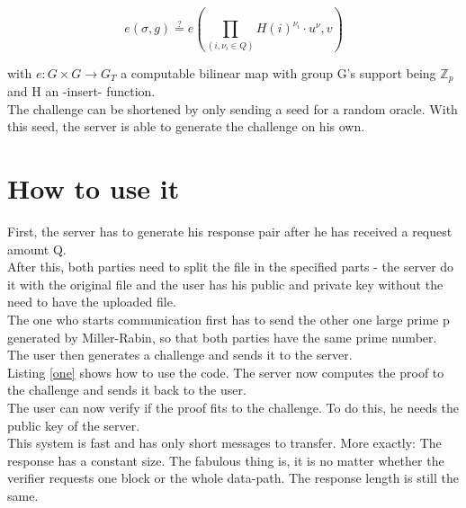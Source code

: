\documentclass{amsart}
\begin{document}
\begin{equation}
e(\sigma, g) \overset{?}{=} e(\prod_{(i,\nu_{i} \in Q)} H(i)^{\nu_{i}} \cdot u^{\nu}, v)
\end{equation}

with $e: G \times G \rightarrow G_{T}$ a computable bilinear map with group G's support being $\mathbb{Z}_{p}$ and H an -insert- function.\\

The challenge can be shortened by only sending a seed for a random oracle. With this seed, the server is able to generate the challenge on his own.



\section{How to use it}
First, the server has to generate his response pair after he has received a request amount Q.\\
After this, both parties need to split the file in the specified parts - the server do it with the original file and the user has his public and private key without the need to have the uploaded file.\\
The one who starts communication first has to send the other one large prime p generated by Miller-Rabin, so that both parties have the same prime number. The user then generates a challenge and sends it to the server.\\
Listing \ref{one} shows how to use the code. The server now computes the proof to the challenge and sends it back to the user. \\
The user can now verify if the proof fits to the challenge. To do this, he needs the public key of the server.\\

This system is fast and has only short messages to transfer. More exactly: The response has a constant size. The fabulous thing is, it is no matter whether the verifier requests one block or the whole data-path. The response length is still the same.\\
\end{document}

